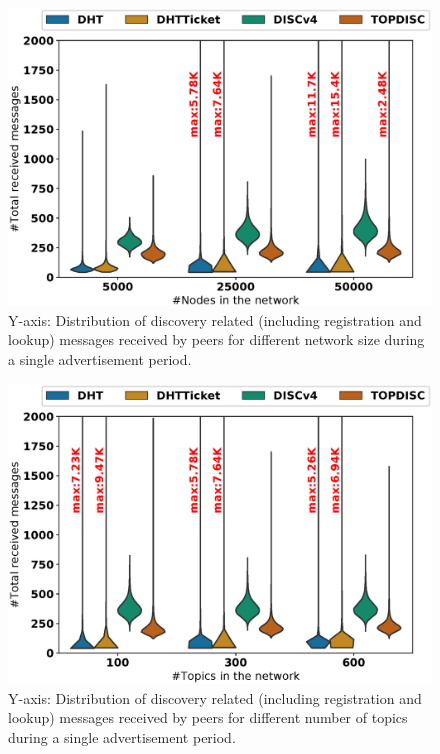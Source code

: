 \begin{figure}[!h]
\centering
\includegraphics[width=\linewidth]{results/no_split/violin_size_totalMsg.eps}
\caption{Y-axis: Distribution of discovery related (including registration and lookup) messages received by peers for different network size during a single advertisement period.}
\label{fig:msgsPerSize}
\end{figure}

\begin{figure}
\centering
\includegraphics[width=\linewidth]{results/no_split/violin_topic_totalMsg.eps}
\caption{Y-axis: Distribution of discovery related (including registration and lookup) messages received by peers for different number of topics during a single advertisement period.}
\label{fig:msgsPerTopic}
\end{figure}

